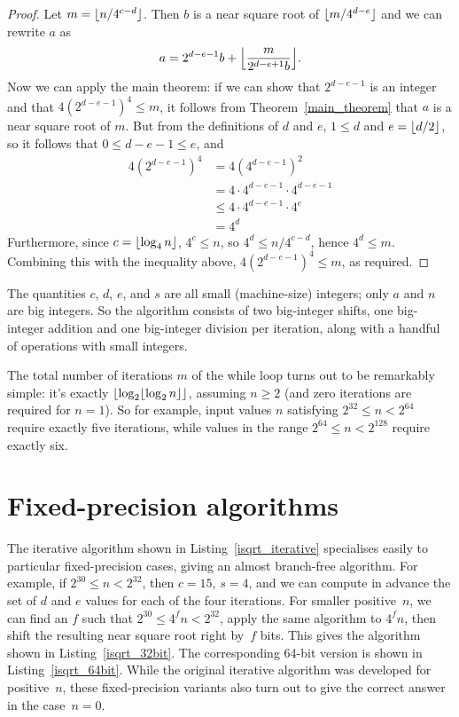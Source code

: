 \documentclass[a4paper]{article}
\DeclarePairedDelimiter\floor{\lfloor}{\rfloor}
\theoremstyle{plain}
\theoremstyle{definition}
\begin{document}
\begin{proof}
  Let $m = \floor{n / 4^{c-d}}$. Then $b$ is a near square root of
  $\floor{m/4^{d-e}}$ and we can rewrite $a$ as
  $$a = 2^{d-e-1}b + \floor*{\frac{m}{2^{d-e+1}b}}.$$ Now we can apply the main
  theorem: if we can show that $2^{d-e-1}$ is an integer and that
  $4(2^{d-e-1})^4 \le m$, it follows from Theorem~\ref{main_theorem} that $a$
  is a near square root of $m$. But from the definitions of $d$ and $e$, $1 \le
  d$ and $e = \floor{d/2}$, so it follows that $0 \le d - e - 1 \le e$, and
  \begin{align*}
    4(2^{d-e-1})^4 &= 4(4^{d-e-1})^2 \\
                  &= 4\cdot 4^{d-e-1}\cdot 4^{d-e-1} \\
                  &\le 4\cdot 4^{d-e-1}\cdot 4^e \\
                  &= 4^d
  \end{align*}
  Furthermore, since $c = \floor{\log_4 n}$, $4^c \le n$, so $4^d \le n /
  4^{c-d}$, hence $4^d \le m$. Combining this with the inequality above,
  $4(2^{d-e-1})^4 \le m$, as required.
\end{proof}

The quantities $c$, $d$, $e$, and $s$ are all small (machine-size) integers;
only $a$ and $n$ are big integers. So the algorithm consists of two big-integer
shifts, one big-integer addition and one big-integer division per iteration,
along with a handful of operations with small integers.

The total number of iterations $m$ of the while loop turns out to be remarkably
simple: it's exactly $\floor*{\log_2 \floor{\log_2 n}}$, assuming $n\ge 2$ (and
zero iterations are required for $n = 1$). So for example, input values $n$
satisfying $2^{32} \le n < 2^{64}$ require exactly five iterations, while
values in the range $2^{64} \le n < 2^{128}$ require exactly six.

\section{Fixed-precision algorithms}

The iterative algorithm shown in Listing~\ref{isqrt_iterative} specialises
easily to particular fixed-precision cases, giving an almost branch-free
algorithm. For example, if $2^{30} \le n < 2^{32}$, then $c = 15$, $s=4$, and
we can compute in advance the set of $d$ and $e$ values for each of the four
iterations. For smaller positive~$n$, we can find an $f$ such that $2^{30} \le
4^f n < 2^{32}$, apply the same algorithm to $4^f n$, then shift the resulting
near square root right by~$f$ bits. This gives the algorithm shown in
Listing~\ref{isqrt_32bit}. The corresponding 64-bit version is shown in
Listing~\ref{isqrt_64bit}. While the original iterative algorithm was developed for
positive~$n$, these fixed-precision variants also turn out to give the correct
answer in the case~$n = 0$.
\end{document}
